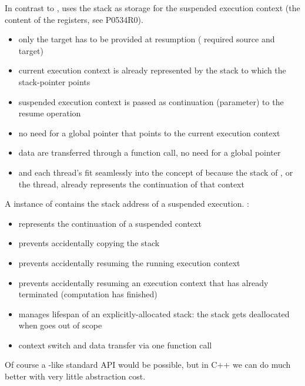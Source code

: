 \newpage
{}


In contrast to \uc, \cc uses the stack as storage for the suspended
execution context (the content of the registers, see P0534R0\cite{P0534R0}).

\begin{itemize}
    \item only the target has to be provided at resumption
        ( required source and target)
    \item current execution context is already represented by the
        stack to which the stack-pointer points
    \item suspended execution context is passed as continuation (parameter) 
        to the resume operation
    \item no need for a global pointer that points to the current execution context
    \item data are transferred through a function call, no need for a global pointer
    \item \main and each thread's \entryfn fit seamlessly into the concept of \cc
        because the stack of \main, or the thread, already represents the continuation of
        that context
\end{itemize}


A instance of \cont contains the stack address of a suspended execution.
\cont:

\begin{itemize}
    \item represents the continuation of a suspended context
    \item prevents accidentally copying the stack
    \item prevents accidentally resuming the running execution
        context
    \item prevents accidentally resuming an execution context that has already
        terminated (computation has finished)
    \item manages lifespan of an explicitly-allocated stack: the stack gets
        deallocated when \cont goes out of scope
    \item context switch and data transfer via one function call
\end{itemize}

Of course a \uc-like standard API would be possible, but in C++ we can do much
better with very little abstraction cost.

